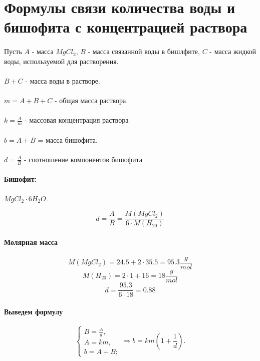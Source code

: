 
\section{Формулы связи количества воды и бишофита с концентрацией раствора}

\paragraph{} Пусть 
$A$ - масса $MgCl_2$, 
$B$ - масса связанной воды в бишлфите, 
$C$ - масса жидкой воды, используемой для растворения.

\paragraph{}$B+C$ - масса воды в растворе.
\paragraph{}$m=A+B+C$ - общая масса раствора.
\paragraph{}$k = \frac{A}{m}$ - массовая концентрация раствора
\paragraph{}$b = A+B$ = масса бишофита.
\paragraph{}$d = \frac{A}{B}$ - соотношение компонентов бишофита 

\paragraph{Бишофит:} $MgCl_2 \cdot 6H_2O$.

$$d = \frac{A}{B} = \frac{M\left( MgCl_2 \right)}{6 \cdot M\left( H_20 \right)}$$

\paragraph{Молярная масса}
$$M\left( MgCl_2 \right) = 24.5 + 2 \cdot 35.5 = 95.3 \frac{g}{mol}$$
$$M\left( H_20 \right) = 2 \cdot 1 + 16 = 18 \frac{g}{mol}$$
$$d = \frac{95.3}{6 \cdot 18} = 0.88$$

\paragraph{Выведем формулу}
$$
\left\{
\begin{array}{l}
B = \frac{A}{d},\\
A =  km,\\
b = A + B;
\end{array}
\right.
\Rightarrow
b = km \left(1 + \frac{1}{d} \right ).
$$

